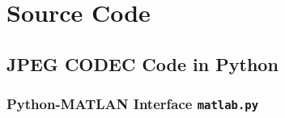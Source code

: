 \appendix

\begingroup

\chapter{Source Code}
\label{app:code}


\section{JPEG CODEC Code in Python}
\label{app:sec:python}

\subsection{Python-MATLAN Interface \texttt{matlab.py}}



\endgroup
